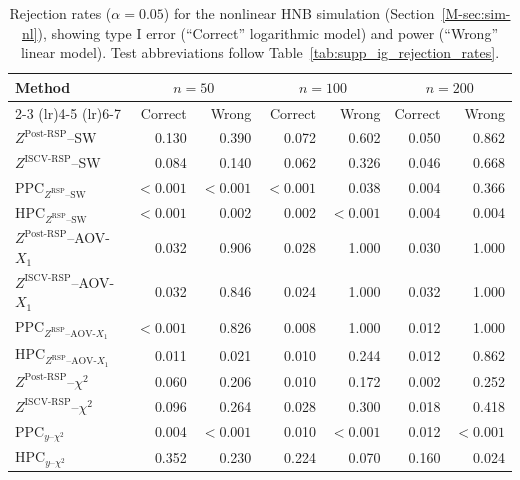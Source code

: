 \documentclass[
  12pt]{article}
\theoremstyle{plain}
\theoremstyle{definition}
\theoremstyle{remark}
\begin{document}
\begin{table}[!htbp]
\centering
\caption{Rejection rates ($\alpha=0.05$) for the nonlinear HNB simulation (Section~\ref{M-sec:sim-nl}), showing type I error (``Correct'' logarithmic model) and power (``Wrong'' linear model). Test abbreviations follow Table~\ref{tab:supp_ig_rejection_rates}.}
\label{tab:supp_hnb_nonlinear_rejection_rates}
\scriptsize
\setlength{\tabcolsep}{4pt}
\renewcommand{\arraystretch}{1.15}
\begin{tabular}{lrrrrrr}
\toprule
Method 
& \multicolumn{2}{c}{$n=50$} 
& \multicolumn{2}{c}{$n=100$} 
& \multicolumn{2}{c}{$n=200$} \\
\cmidrule(lr){2-3} \cmidrule(lr){4-5} \cmidrule(lr){6-7}
& Correct & Wrong 
& Correct & Wrong 
& Correct & Wrong \\
\midrule
$Z^{\mathrm{Post\mbox{-}RSP}}$--SW 
& 0.130 & 0.390 & 0.072 & 0.602 & 0.050 & 0.862 \\
$Z^{\mathrm{ISCV\mbox{-}RSP}}$--SW 
& 0.084 & 0.140 & 0.062 & 0.326 & 0.046 & 0.668 \\
PPC$_{Z^{\mathrm{RSP}}\text{--SW}}$ 
& $<0.001$  & $<0.001$  & $<0.001$  & 0.038 & 0.004 & 0.366 \\
HPC$_{Z^{\mathrm{RSP}}\text{--SW}}$ 
& $<0.001$  & 0.002 & 0.002 & $<0.001$  & 0.004 & 0.004 \\
\midrule
$Z^{\mathrm{Post\mbox{-}RSP}}$--AOV-$X_1$ 
& 0.032 & 0.906 & 0.028 & 1.000 & 0.030 & 1.000 \\
$Z^{\mathrm{ISCV\mbox{-}RSP}}$--AOV-$X_1$ 
& 0.032 & 0.846 & 0.024 & 1.000 & 0.032 & 1.000 \\
PPC$_{Z^{\mathrm{RSP}}\text{--AOV-}X_1}$ 
& $<0.001$  & 0.826 & 0.008 & 1.000 & 0.012 & 1.000 \\
HPC$_{Z^{\mathrm{RSP}}\text{--AOV-}X_1}$ 
& 0.011 & 0.021 & 0.010 & 0.244 & 0.012 & 0.862 \\
\midrule
$Z^{\mathrm{Post\mbox{-}RSP}}$--$\chi^2$ 
& 0.060 & 0.206 & 0.010 & 0.172 & 0.002 & 0.252 \\
$Z^{\mathrm{ISCV\mbox{-}RSP}}$--$\chi^2$ 
& 0.096 & 0.264 & 0.028 & 0.300 & 0.018 & 0.418 \\
PPC$_{y\text{--}\chi^2}$ 
& 0.004 & $<0.001$  & 0.010 & $<0.001$  & 0.012 & $<0.001$  \\
HPC$_{y\text{--}\chi^2}$ 
& 0.352 & 0.230 & 0.224 & 0.070 & 0.160 & 0.024 \\
\bottomrule
\end{tabular}
\end{table}

\clearpage
\end{document}
